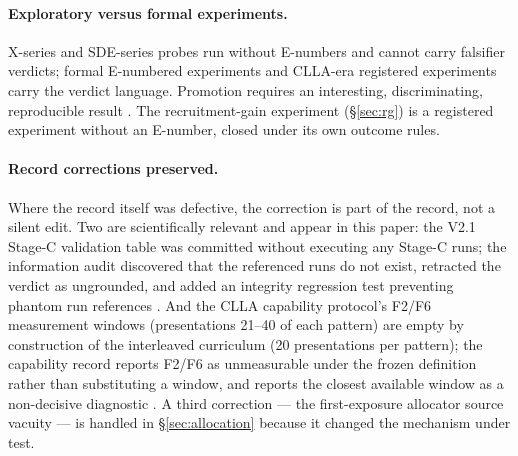 \paragraph{Exploratory versus formal experiments.}
X-series and SDE-series probes run without E-numbers and cannot carry
falsifier verdicts; formal E-numbered experiments and CLLA-era
registered experiments carry the verdict language. Promotion requires
an interesting, discriminating, reproducible result \cite{overview}.
The recruitment-gain experiment (§\ref{sec:rg}) is a registered
experiment without an E-number, closed under its own outcome rules.

\paragraph{Record corrections preserved.}
Where the record itself was defective, the correction is part of the
record, not a silent edit. Two are scientifically relevant and appear in
this paper: the V2.1 Stage-C validation table was committed without
executing any Stage-C runs; the information audit discovered that the
referenced runs do not exist, retracted the verdict as ungrounded, and
added an integrity regression test preventing phantom run references
\cite{infoaudit,overview}. And the CLLA capability protocol's F2/F6
measurement windows (presentations 21--40 of each pattern) are empty by
construction of the interleaved curriculum (20 presentations per
pattern); the capability record reports F2/F6 as unmeasurable under the
frozen definition rather than substituting a window, and reports the
closest available window as a non-decisive diagnostic \cite{capability}.
A third correction --- the first-exposure allocator source vacuity ---
is handled in \S\ref{sec:allocation} because it changed the mechanism
under test.